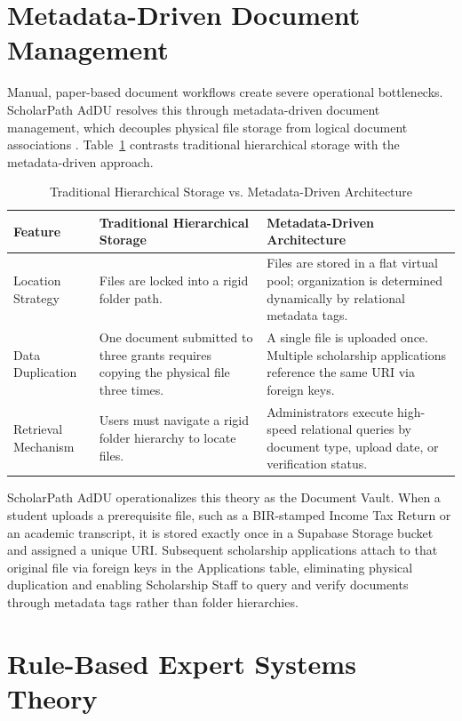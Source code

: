 \section{Metadata-Driven Document Management}

Manual, paper-based document workflows create severe operational bottlenecks. ScholarPath AdDU resolves this through metadata-driven document management, which decouples physical file storage from logical document associations \cite{ref25}. Table~\ref{tab:vault} contrasts traditional hierarchical storage with the metadata-driven approach. \begin{table}[htbp]
  \centering
  \small
  \begin{tabular}{@{}p{2.8cm} p{5.5cm} p{5.5cm}@{}}
    \toprule
    Feature & Traditional Hierarchical Storage & Metadata-Driven Architecture \\
    \midrule
    Location Strategy & Files are locked into a rigid folder path. & Files are stored in a flat virtual pool; organization is determined dynamically by relational metadata tags. \\
    \addlinespace
    Data Duplication & One document submitted to three grants requires copying the physical file three times. & A single file is uploaded once. Multiple scholarship applications reference the same URI via foreign keys. \\
    \addlinespace
    Retrieval Mechanism & Users must navigate a rigid folder hierarchy to locate files. & Administrators execute high-speed relational queries by document type, upload date, or verification status. \\
    \bottomrule
  \end{tabular}
  \caption{Traditional Hierarchical Storage vs. Metadata-Driven Architecture}
  \label{tab:vault}
\end{table}
 ScholarPath AdDU operationalizes this theory as the Document Vault. When a student uploads a prerequisite file, such as a BIR-stamped Income Tax Return or an academic transcript, it is stored exactly once in a Supabase Storage bucket and assigned a unique URI. Subsequent scholarship applications attach to that original file via foreign keys in the Applications table, eliminating physical duplication and enabling Scholarship Staff to query and verify documents through metadata tags rather than folder hierarchies.

\section{Rule-Based Expert Systems Theory}

